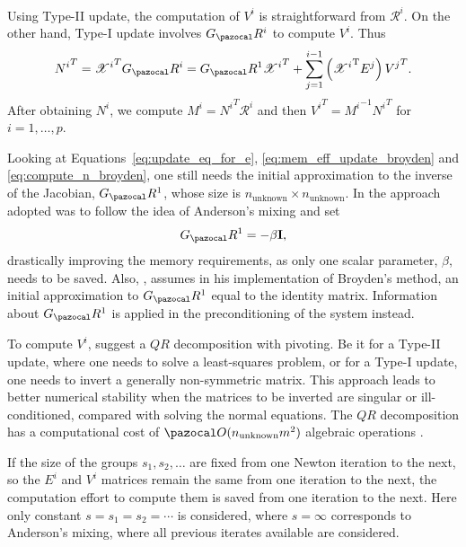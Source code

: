 Using Type-II update, the computation of \(V^{i}\) is straightforward from \(\mathscr{R}^{i}\).
On the other hand, Type-I update involves \(G_\pazocal R^{i}\) to compute \(V^{i}\).
Thus
\begin{equation} \label{eq:compute_n_broyden}
  {N^{i}}^T={\mathscr{X}^{i}}^T G_\pazocal R^{i}=G_\pazocal R^1 {\mathscr{X}^{i}}^T+\sum_{j=1}^{i-1}\left({\mathscr{X}^{i}}^{\mathrm{T}} E^{j}\right) {V^{j}}^T.
\end{equation}
After obtaining \(N^{i}\), we compute \(M^{i}={N^{i}}^T \mathscr{R}^{i}\) and then \({V^{i}}^T={M^{i}}^{-1} {N^{i}}^T\) for \(i=1, \ldots, p\).

Looking at Equations~\eqref{eq:update_eq_for_e}, \eqref{eq:mem_eff_update_broyden} and \eqref{eq:compute_n_broyden}, one still needs the initial approximation to the inverse of the Jacobian, \(G_\pazocal R^1\), whose size is \(n_\text{unknown}\times n_\text{unknown}\).
In \cite{fang_two_2009} the approach adopted was to follow the idea of Anderson's mixing and set
\begin{equation}
  G_\pazocal R^1 = - \beta \mathbf I,
\end{equation}
drastically improving the memory requirements, as only one scalar parameter, \(\beta\), needs to be saved.
Also, \cite{kelley_solving_2003}, assumes in his implementation of Broyden's method, an initial approximation to \(G_\pazocal R^1\) equal to the identity matrix.
Information about \(G_\pazocal R^1\) is applied in the preconditioning of the system instead.

To compute \(V^i\), \cite{fang_two_2009} suggest a \(QR\) decomposition with pivoting.
Be it for a Type-II update, where one needs to solve a least-squares problem, or for a Type-I update, one needs to invert a generally non-symmetric matrix.
This approach leads to better numerical stability when the matrices to be inverted are singular or ill-conditioned, compared with solving the normal equations.
The \(QR\) decomposition has a computational cost of \(\pazocal O(n_\text{unknown}m^2)\) algebraic operations \citep{dennis_numerical_1996}.

If the size of the groups \(s_1, s_2,\dots\) are fixed from one Newton iteration to the next, so the \(E^i\) and \(V^i\) matrices remain the same from one iteration to the next, the computation effort to compute them is saved from one iteration to the next.
Here only constant \(s=s_1=s_2 =\cdots\) is considered, where \(s=\infty\) corresponds to Anderson's mixing, where all previous iterates available are considered.

